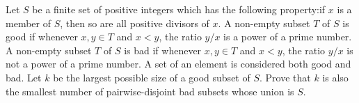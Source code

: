 Let $S$ be a finite set of positive integers which has the following property:if $x$ is a member of $S$, then so are all positive divisors of $x$. A non-empty subset $T$ of $S$ is good if whenever $x,y\in T$ and $x<y$,  the ratio $y/x$ is a power of a prime number. A non-empty subset $T$ of $S$ is bad if whenever $x,y\in T$ and $x<y$,  the ratio $y/x$ is not a power of a prime number. A set of an element is considered both good and bad. Let $k$ be the largest possible size of a good subset of $S$. Prove that $k$ is also the smallest number of pairwise-disjoint bad subsets whose union is $S$.